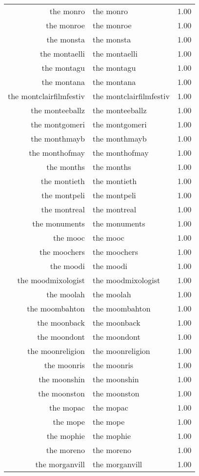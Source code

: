 \begin{table}[ht]
\begin{tabular}{rlr}
  the monro & the monro & 1.00 \\ 
  the monroe & the monroe & 1.00 \\ 
  the monsta & the monsta & 1.00 \\ 
  the montaelli & the montaelli & 1.00 \\ 
  the montagu & the montagu & 1.00 \\ 
  the montana & the montana & 1.00 \\ 
  the montclairfilmfestiv & the montclairfilmfestiv & 1.00 \\ 
  the monteeballz & the monteeballz & 1.00 \\ 
  the montgomeri & the montgomeri & 1.00 \\ 
  the monthmayb & the monthmayb & 1.00 \\ 
  the monthofmay & the monthofmay & 1.00 \\ 
  the months & the months & 1.00 \\ 
  the montieth & the montieth & 1.00 \\ 
  the montpeli & the montpeli & 1.00 \\ 
  the montreal & the montreal & 1.00 \\ 
  the monuments & the monuments & 1.00 \\ 
  the mooc & the mooc & 1.00 \\ 
  the moochers & the moochers & 1.00 \\ 
  the moodi & the moodi & 1.00 \\ 
  the moodmixologist & the moodmixologist & 1.00 \\ 
  the moolah & the moolah & 1.00 \\ 
  the moombahton & the moombahton & 1.00 \\ 
  the moonback & the moonback & 1.00 \\ 
  the moondont & the moondont & 1.00 \\ 
  the moonreligion & the moonreligion & 1.00 \\ 
  the moonris & the moonris & 1.00 \\ 
  the moonshin & the moonshin & 1.00 \\ 
  the moonston & the moonston & 1.00 \\ 
  the mopac & the mopac & 1.00 \\ 
  the mope & the mope & 1.00 \\ 
  the mophie & the mophie & 1.00 \\ 
  the moreno & the moreno & 1.00 \\ 
  the morganvill & the morganvill & 1.00 \\ 

\end{tabular}
\end{table}
